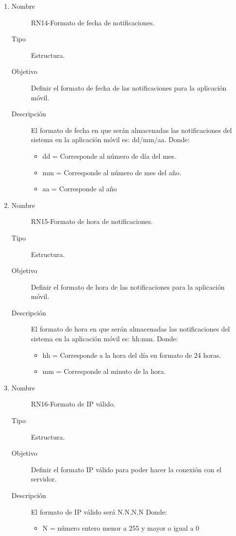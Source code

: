 \begin{enumerate}[label=RN\arabic*.]
\item \label{RN14}
		\begin{description}
			\item[Nombre] RN14-Formato de fecha de notificaciones.
			\item[Tipo] Estructura.
			\item[Objetivo] Definir el formato de fecha de las notificaciones para la aplicación móvil.
			\item[Descripción] El formato de fecha en que serán almacenadas las notificaciones del sistema en la aplicación móvil es: dd/mm/aa.
			Donde:
			\begin{itemize}
		 		\item dd = Corresponde al número de día del mes.
		 		\item mm = Corresponde al número de mes del año.
		 		\item aa = Corresponde al año
		    \end{itemize}
		\end{description}
		
\item \label{RN15}
		\begin{description}
			\item[Nombre] RN15-Formato de hora de notificaciones.
			\item[Tipo] Estructura.
			\item[Objetivo] Definir el formato de hora de las notificaciones para la aplicación móvil.
			\item[Descripción] El formato de hora en que serán almacenadas las notificaciones del sistema en la aplicación móvil es: hh:mm.
			Donde:
			\begin{itemize}
		 		\item hh = Corresponde a la hora del día en formato de 24 horas.
		 		\item mm = Corresponde al minuto de la hora.
		    \end{itemize}
		\end{description}

\item \label{RN16}
		\begin{description}
			\item[Nombre] RN16-Formato de IP válido.
			\item[Tipo] Estructura.
			\item[Objetivo] Definir el formato IP válido para poder hacer la conexión con el servidor.
			\item[Descripción] El formato de IP válido será N.N.N.N
			Donde:
			\begin{itemize}
		 		\item N = número entero menor a 255 y mayor o igual a 0
		    \end{itemize}
		\end{description}
\end{enumerate}

